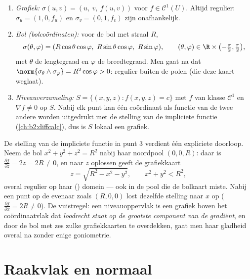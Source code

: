 \begin{example}\label{ex:b2:surfaces:standard}
\leavevmode
\begin{enumerate}
\item \emph{Grafiek:} $\sigma(u, v) = (u,\ v,\ f(u, v))$ voor $f
\in \mathcal{C}^1(U)$. Altijd regulier: $\sigma_u = (1, 0, f_u)$ en
$\sigma_v = (0, 1, f_v)$ zijn onafhankelijk.
\item \emph{Bol (bolcoördinaten):} voor de bol met straal $R$,
\[
\sigma(\theta, \varphi)
= (R\cos\theta\cos\varphi,\ R\sin\theta\cos\varphi,\
R\sin\varphi),
\qquad
(\theta, \varphi) \in \R \times
\bigl(-\tfrac\pi2, \tfrac\pi2\bigr),
\]
met $\theta$ de lengtegraad en $\varphi$ de breedtegraad. Men gaat
na dat $\norm{\sigma_\theta \wedge \sigma_\varphi} =
R^2\cos\varphi > 0$: regulier buiten de polen (die deze kaart
weglaat).
\item \emph{Niveauverzameling:} $S = \{(x,y,z) : f(x, y, z) = c\}$
met $f$ van klasse $\mathcal{C}^1$ en $\nabla f \neq 0$ op $S$.
Nabij elk punt kan één coördinaat als functie van de twee andere
worden uitgedrukt met de stelling van de impliciete functie
(\cref{ch:b2:diffcalc}), dus is $S$ lokaal een grafiek.
\end{enumerate}
\end{example}

\begin{example}
\label{ex:b2:surfaces:levelgraph}
De stelling van de impliciete functie in punt 3 verdient één
expliciete doorloop. Neem de bol $x^2 + y^2 + z^2 = R^2$ nabij haar
noordpool $(0, 0, R)$: daar is $\frac{\partial f}{\partial z} = 2z
= 2R \neq 0$, en naar $z$ oplossen geeft de grafiekkaart
\[
z = \sqrt{R^2 - x^2 - y^2},
\qquad x^2 + y^2 < R^2 ,
\]
overal regulier op haar () domein --- ook in de pool die de
bolkaart miste. Nabij een punt op de evenaar zoals $(R, 0, 0)$ lost
dezelfde stelling naar $x$ op ($\frac{\partial f}{\partial x} = 2R
\neq 0$). De vuistregel: een niveauoppervlak is een grafiek boven
het coördinaatvlak dat \emph{loodrecht staat op de grootste
component van de gradiënt}, en door de bol met zes zulke
grafiekkaarten te overdekken, gaat men haar gladheid overal na
zonder enige goniometrie.
\end{example}

\section{Raakvlak en normaal}

